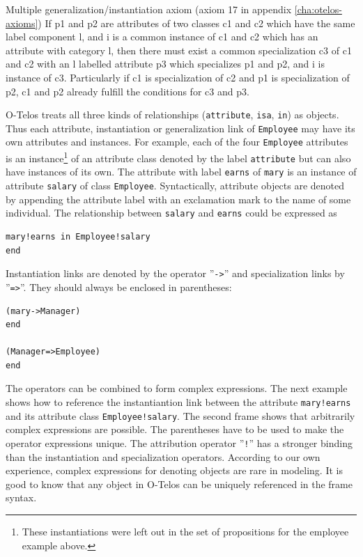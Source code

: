 \begin{axiom}{Multiple generalization/instantiation axiom (axiom 17 in appendix \ref{cha:otelos-axioms})}
  If p1 and p2 are attributes of two classes c1 and c2 which have the
  same label component l, and i is a common instance of c1 and c2
  which has an attribute with category l, then there must exist a
  common specialization c3 of c1 and c2 with an l labelled attribute
  p3 which specializes p1 and p2, and i is instance of c3.
  Particularly if c1 is specialization of c2 and p1 is specialization
  of p2, c1 and p2 already fulfill the conditions for c3 and p3.
\end{axiom}

O-Telos treats all three kinds of relationships ({\tt attribute}, {\tt isa}, {\tt in}) as
objects. Thus each attribute, instantiation or generalization link of
{\tt Employee} may have its own attributes and instances.  For example, each of
the four {\tt Employee} attributes is an instance\footnote{These
  instantiations were left out in the set of propositions for the
  employee example above.} of an attribute class denoted by the label
{\tt attribute} but can also have instances of its own. The attribute with
label {\tt earns} of {\tt mary} is an instance of attribute {\tt salary} of class
{\tt Employee}. Syntactically, attribute objects are denoted by appending
the attribute label with an exclamation mark to the name of some
individual. The relationship between {\tt salary} and {\tt earns} could be
expressed as


\begin{verbatim}
mary!earns in Employee!salary
end
\end{verbatim}

Instantiation links are denoted by the operator ''\verb/->/'' and specialization links by 
''\verb/=>/''. They should always be enclosed in parentheses:

\begin{verbatim}
(mary->Manager)
end

(Manager=>Employee)
end
\end{verbatim}

The operators can be combined to form complex expressions.
The next example shows how to reference the instantiantion link
between the attribute {\tt mary!earns} and its attribute class {\tt Employee!salary}.
The second frame shows that arbitrarily complex expressions are possible.
The parentheses have to be used to make the operator expressions unique. The attribution operator
''\verb/!/'' has a stronger binding than the instantiation and specialization operators.
According to our own experience, complex expressions for denoting objects are rare in modeling.
It is good to know that any object in O-Telos can be
uniquely referenced in the frame syntax.

